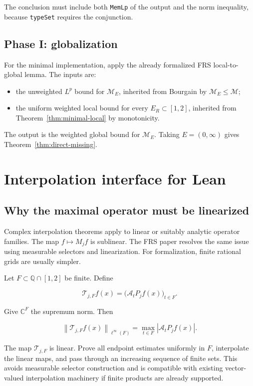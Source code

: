 \documentclass[11pt,a4paper]{article}
\theoremstyle{definition}
\theoremstyle{remark}
\newcommand{\C}{\mathbb{C}}
\newcommand{\M}{\mathcal{M}}
\newcommand{\A}{\mathcal{A}}
\newcommand{\norm}[1]{\left\lVert #1\right\rVert}
\newcommand{\abs}[1]{\left\lvert #1\right\rvert}
\newcommand{\lean}{\texttt}
\begin{document}
The conclusion must include both \lean{MemLp} of the output and the norm
inequality, because \lean{typeSet} requires the conjunction.

\subsection{Phase I: globalization}

For the minimal implementation, apply the already formalized FRS local-to-global
lemma.  The inputs are:

\begin{itemize}[leftmargin=7mm]
\item the unweighted $L^p$ bound for $\M_E$, inherited from Bourgain by
      $\M_E\leq\M$;
\item the uniform weighted local bound for every $E_R\subset[1,2]$, inherited
      from Theorem~\ref{thm:minimal-local} by monotonicity.
\end{itemize}

The output is the weighted global bound for $\M_E$.  Taking
$E=(0,\infty)$ gives Theorem~\ref{thm:direct-missing}.

\section{Interpolation interface for Lean}

\subsection{Why the maximal operator must be linearized}

Complex interpolation theorems apply to linear or suitably analytic operator
families.  The map $f\mapsto M_jf$ is sublinear.  The FRS paper resolves the
same issue using measurable selectors and linearization.  For formalization,
finite rational grids are usually simpler.

Let $F\subset\mathbb{Q}\cap[1,2]$ be finite.  Define

\[
\mathcal{T}_{j,F}f(x)=\bigl(\A_tP_jf(x)\bigr)_{t\in F}.
\]

Give $\C^F$ the supremum norm.  Then

\[
\norm{\mathcal{T}_{j,F}f(x)}_{\ell^\infty(F)}
=
\max_{t\in F}\abs{\A_tP_jf(x)}.
\]

The map $\mathcal{T}_{j,F}$ is linear.  Prove all endpoint estimates uniformly
in $F$, interpolate the linear maps, and pass through an increasing sequence
of finite sets.  This avoids measurable selector construction and is compatible
with existing vector-valued interpolation machinery if finite products are
already supported.
\end{document}
